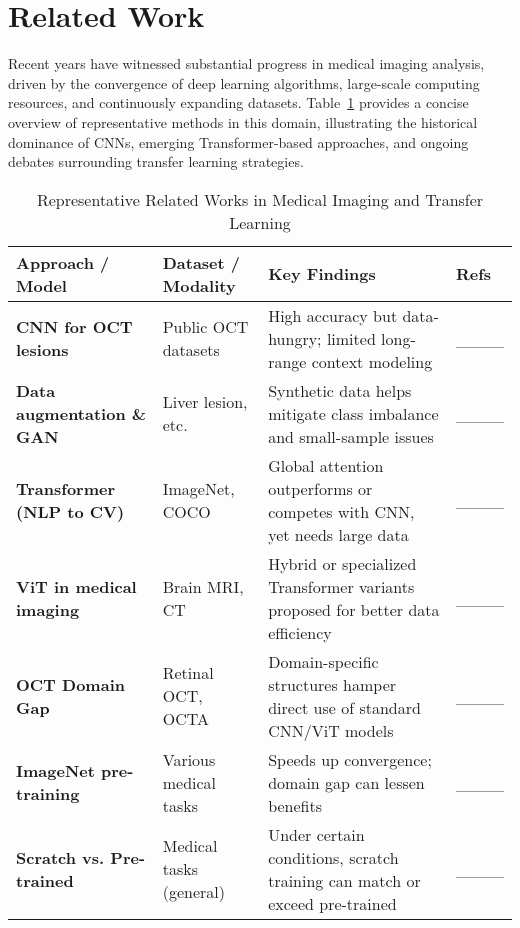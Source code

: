 \section{Related Work}
\label{sec:related}
	
	Recent years have witnessed substantial progress in medical imaging analysis, driven by the convergence of deep learning algorithms, large-scale computing resources, and continuously expanding datasets. Table~\ref{tab:relatedsummary} provides a concise overview of representative methods in this domain, illustrating the historical dominance of CNNs, emerging Transformer-based approaches, and ongoing debates surrounding transfer learning strategies.
	
	\begin{table}[ht]
		\centering
		\caption{Representative Related Works in Medical Imaging and Transfer Learning}
		\label{tab:relatedsummary}
		\begin{tabular}{p{3.2cm}p{3.6cm}p{5cm}p{1.2cm}}
			\toprule
			\textbf{Approach / Model} 
			& \textbf{Dataset / Modality} 
			& \textbf{Key Findings} 
			& \textbf{Refs} \\
			\midrule
			\textbf{CNN for OCT lesions}  
			& Public OCT datasets  
			& High accuracy but data-hungry; limited long-range context modeling  
			& ____ \\
			
			\textbf{Data augmentation \& GAN}  
			& Liver lesion, etc.  
			& Synthetic data helps mitigate class imbalance and small-sample issues  
			& ____ \\
			
			\textbf{Transformer (NLP to CV)}
			& ImageNet, COCO  
			& Global attention outperforms or competes with CNN, yet needs large data  
			& ____ \\
			
			\textbf{ViT in medical imaging}  
			& Brain MRI, CT  
			& Hybrid or specialized Transformer variants proposed for better data efficiency  
			& ____ \\
			
			\textbf{OCT Domain Gap}  
			& Retinal OCT, OCTA  
			& Domain-specific structures hamper direct use of standard CNN/ViT models  
			& ____ \\
			
			\textbf{ImageNet pre-training}  
			& Various medical tasks  
			& Speeds up convergence; domain gap can lessen benefits  
			& ____ \\
			
			\textbf{Scratch vs. Pre-trained}  
			& Medical tasks (general)  
			& Under certain conditions, scratch training can match or exceed pre-trained  
			& ____ \\
			\bottomrule
		\end{tabular}
	\end{table}
	
